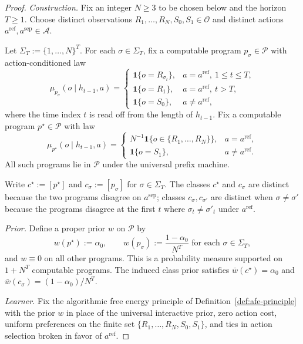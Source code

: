 \documentclass[11pt]{article}
\theoremstyle{definition}
\theoremstyle{remark}
\newcommand{\Acal}{\mathcal{A}}
\newcommand{\Ocal}{\mathcal{O}}
\newcommand{\Pcal}{\mathcal{P}}
\newcommand{\one}{\mathbf{1}}
\begin{document}
\begin{proof}
\emph{Construction.} Fix an integer $N\ge 3$ to be chosen below and the horizon $T\ge 1$. Choose distinct observations $R_1,\dots,R_N,S_0,S_1\in\Ocal$ and distinct actions $a^{\mathrm{ref}},a^{\mathrm{sep}}\in\Acal$.

Let $\Sigma_T:=\{1,\dots,N\}^T$. For each $\sigma\in\Sigma_T$, fix a computable program $p_\sigma\in\Pcal$ with action-conditioned law
\[
\mu_{p_\sigma}(o\mid h_{t-1},a)
=
\begin{cases}
\one\{o=R_{\sigma_t}\}, & a=a^{\mathrm{ref}},\ 1\le t\le T,\\
\one\{o=R_1\},         & a=a^{\mathrm{ref}},\ t>T,\\
\one\{o=S_0\},         & a\neq a^{\mathrm{ref}},
\end{cases}
\]
where the time index $t$ is read off from the length of $h_{t-1}$. Fix a computable program $p^\star\in\Pcal$ with law
\[
\mu_{p^\star}(o\mid h_{t-1},a)
=
\begin{cases}
N^{-1}\one\{o\in\{R_1,\dots,R_N\}\}, & a=a^{\mathrm{ref}},\\
\one\{o=S_1\},                        & a\neq a^{\mathrm{ref}}.
\end{cases}
\]
All such programs lie in $\Pcal$ under the universal prefix machine.

Write $c^\star:=[p^\star]$ and $c_\sigma:=[p_\sigma]$ for $\sigma\in\Sigma_T$. The classes $c^\star$ and $c_\sigma$ are distinct because the two programs disagree on $a^{\mathrm{sep}}$; classes $c_\sigma,c_{\sigma'}$ are distinct when $\sigma\neq\sigma'$ because the programs disagree at the first $t$ where $\sigma_t\neq\sigma'_t$ under $a^{\mathrm{ref}}$.

\emph{Prior.} Define a proper prior $w$ on $\Pcal$ by
\[
w(p^\star):=\alpha_0,\qquad w(p_\sigma):=\frac{1-\alpha_0}{N^T}\text{ for each }\sigma\in\Sigma_T,
\]
and $w\equiv 0$ on all other programs. This is a probability measure supported on $1+N^T$ computable programs. The induced class prior satisfies $\bar w(c^\star)=\alpha_0$ and $\bar w(c_\sigma)=(1-\alpha_0)/N^T$.

\emph{Learner.} Fix the algorithmic free energy principle of Definition~\ref{def:afe-principle} with the prior $w$ in place of the universal interactive prior, zero action cost, uniform preferences on the finite set $\{R_1,\dots,R_N,S_0,S_1\}$, and ties in action selection broken in favor of $a^{\mathrm{ref}}$.


\end{proof}
\end{document}
